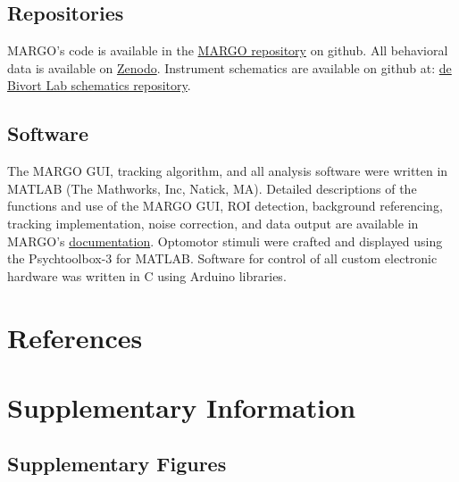 \documentclass[12pt,letterpaper]{article}
\begin{document}
\subsection*{Repositories}

MARGO's code is available in the \href{https://github.com/de-Bivort-Lab/margo}{MARGO repository} on github. All behavioral data is available on \href{https://zenodo.org/record/2596143#.XI2maRNKiRc}{Zenodo}. Instrument schematics are available on github at: \href{https://github.com/de-Bivort-Lab/dblab-schematics}{de Bivort Lab schematics repository}.

\subsection*{Software}
 
The MARGO GUI, tracking algorithm, and all analysis software were written in MATLAB (The Mathworks, Inc, Natick, MA). Detailed descriptions of the functions and use of the MARGO GUI, ROI detection, background referencing, tracking implementation, noise correction, and data output are available in MARGO's \href{https://github.com/de-Bivort-Lab/margo/wiki}{documentation}. Optomotor stimuli were crafted and displayed using the Psychtoolbox-3 for MATLAB. Software for control of all custom electronic hardware was written in C using Arduino libraries.

\section{References}



\clearpage
\section{Supplementary Information}

\subsection{Supplementary Figures}
\end{document}

